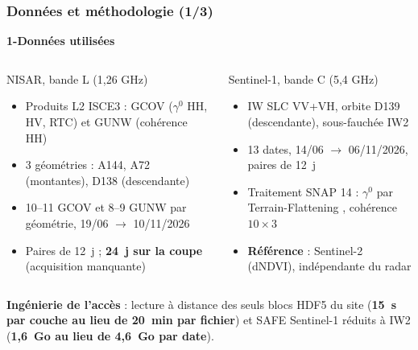 \documentclass[aspectratio=169]{beamer}
\newcommand{\slidesubtitle}[1]{%
	\textcolor{myblue}{\small\textbf{#1}}%
	\par\vspace{3pt}%
}
\begin{document}
\begin{frame}{\phantom{x}}
	\frametitle{Données et méthodologie (1/3)}
	\vspace{-10pt}
	\slidesubtitle{1-Données utilisées}
	\small
	\begin{columns}[T]
		\begin{block}{NISAR, bande L (1,26 GHz)}
			\footnotesize
			\begin{itemize}
				\setlength{\itemsep}{1pt}
				\item Produits L2 ISCE3 \parencite{isce3} : GCOV ($\gamma^0$ HH, HV, RTC) et GUNW (cohérence HH)
				\item 3 géométries : A144, A72 (montantes), D138 (descendante)
				\item 10--11 GCOV et 8--9 GUNW par géométrie, 19/06 $\to$ 10/11/2026
				\item Paires de 12~j ; \textbf{24~j sur la coupe} (acquisition manquante)
			\end{itemize}
		\end{block}

		\begin{block}{Sentinel-1, bande C (5,4 GHz)}
			\footnotesize
			\begin{itemize}
				\setlength{\itemsep}{1pt}
				\item IW SLC VV+VH, orbite D139 (descendante), sous-fauchée IW2 \parencite{torres2012sentinel1}
				\item 13 dates, 14/06 $\to$ 06/11/2026, paires de 12~j
				\item Traitement SNAP 14 \parencite{snap} : $\gamma^0$ par Terrain-Flattening
				\parencite{small2011flattening}, cohérence $10\times3$
				\item \textbf{Référence} : Sentinel-2 (dNDVI), indépendante du radar
			\end{itemize}
		\end{block}
	\end{columns}

	\vspace{0.2em}
	\scriptsize\centering
	\textcolor{myblue}{\textbf{Ingénierie de l'accès}} : lecture à distance des seuls blocs HDF5 du site
	(\textbf{15~s par couche au lieu de 20~min par fichier}) et SAFE Sentinel-1 réduits à IW2
	(\textbf{1,6~Go au lieu de 4,6~Go par date}).
\end{frame}
\end{document}
